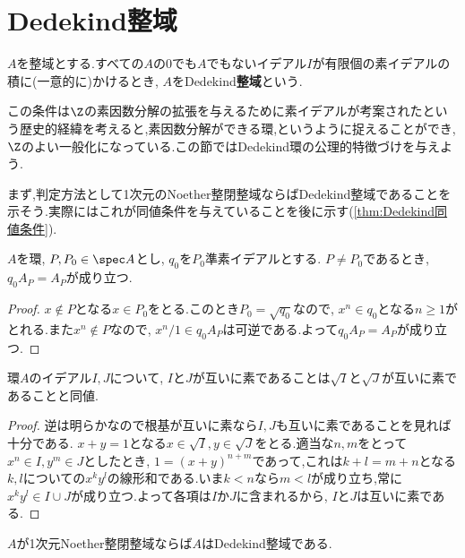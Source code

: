 \section{Dedekind整域}

\begin{defi}[Dedekind整域]
	$A$を整域とする.すべての$A$の0でも$A$でもないイデアル$I$が有限個の素イデアルの積に(一意的に)かけるとき, $A$をDedekind\textbf{整域}という.
\end{defi}

この条件は$\Z$の素因数分解の拡張を与えるために素イデアルが考案されたという歴史的経緯を考えると,素因数分解ができる環,というように捉えることができ, $\Z$のよい一般化になっている.この節ではDedekind環の公理的特徴づけを与えよう.

まず,判定方法として1次元のNoether整閉整域ならばDedekind整域であることを示そう.実際にはこれが同値条件を与えていることを後に示す(\ref{thm:Dedekind同値条件}).

\begin{lem}\label{lem:Dedekind-1}
	$A$を環, $P,P_0\in\spec A$とし, $
	q_0$を$P_0$準素イデアルとする. $P\neq P_0$であるとき, $q_0A_P=A_P$が成り立つ.
\end{lem}

\begin{proof}
	$x\not\in P$となる$x\in P_0$をとる.このとき$P_0=\sqrt{q_0}$なので, $x^n\in q_0$となる$n\geq1$がとれる.また$x^n\not\in P$なので, $x^n/1\in q_0A_P$は可逆である.よって$q_0A_P=A_P$が成り立つ.
\end{proof}

\begin{lem}\label{lem:Dedekind-2}
	環$A$のイデアル$I,J$について, $I$と$J$が互いに素であることは$\sqrt{I}$と$\sqrt{J}$が互いに素であることと同値.
\end{lem}

\begin{proof}
	逆は明らかなので根基が互いに素なら$I,J$も互いに素であることを見れば十分である. $x+y=1$となる$x\in\sqrt{I},y\in\sqrt{J}$をとる.適当な$n,m$をとって$x^n\in I,y^m\in J$としたとき, $1=(x+y)^{n+m}$であって,これは$k+l=m+n$となる$k,l$についての$x^ky^l$の線形和である.いま$k<n$なら$m<l$が成り立ち,常に$x^ky^l\in I\cup J$が成り立つ.よって各項は$I$か$J$に含まれるから, $I$と$J$は互いに素である.
\end{proof}

\begin{thm}\label{thm:1dimNoether整閉整域ならDedekind}
	$A$が1次元Noether整閉整域ならば$A$はDedekind整域である.
\end{thm}

